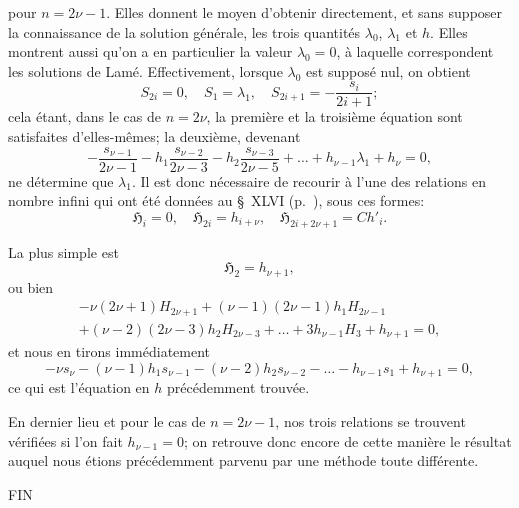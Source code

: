 \documentclass[11pt,leqno,oneside,letterpaper]{book}[2005/09/16]
\begin{document}
pour $n = 2\nu-1$. Elles donnent le moyen d'obtenir directement, et sans
supposer la connaissance de la solution g\'en\'erale, les trois quantit\'es $\lambda_0$, $\lambda_1$
et $h$. Elles montrent aussi qu'on a en particulier la valeur $\lambda_0=0$, \`a laquelle
correspondent les solutions de Lam\'e. Effectivement, lorsque $\lambda_0$ est suppos\'e
nul, on obtient
\[
S_{2i} = 0, \quad S_1 = \lambda_1, \quad S_{2i+1} = -\frac{s_i}{2i+1};
\]
cela \'etant, dans le cas de $n = 2\nu$, la premi\`ere et la troisi\`eme \'equation sont
satisfaites d'elles-m\^emes; la deuxi\`eme, devenant
\[
-\frac{s_{\nu-1}}{2\nu-1} - h_1\frac{s_{\nu-2}}{2\nu-3} - h_2\frac{s_{\nu-3}}{2\nu-5}
  + \ldots + h_{\nu-1} \lambda_1 + h_{\nu} = 0,
\]
ne d\'etermine que $\lambda_1$. Il est donc n\'ecessaire de recourir \`a l'une
des relations en nombre infini qui ont \'et\'e donn\'ees au \S~XLVI
(p.~\pageref{page125}), sous ces formes:
\[
\mathfrak{H}_i = 0, \quad \mathfrak{H}_{2i} = h_{i+\nu}, \quad
   \mathfrak{H}_{2i+2\nu+1} = Ch'_i.
\]

La plus simple est
\[
\mathfrak{H}_2 = h_{\nu+1},
\]
ou bien
\begin{multline*}
-\nu(2\nu+1) H_{2\nu+1} + (\nu-1)(2\nu-1) h_1 H_{2\nu-1} \\
+ (\nu-2)(2\nu-3) h_2 H_{2\nu-3} + \ldots + 3h_{\nu-1} H_3 + h_{\nu+1} = 0,
\end{multline*}
et nous en tirons imm\'ediatement
\[
-\nu s_{\nu} - (\nu-1)h_1 s_{\nu-1} - (\nu-2)h_2 s_{\nu-2} - \ldots - h_{\nu-1} s_1
   +h_{\nu+1} = 0,
\]
ce qui est l'\'equation en $h$ pr\'ec\'edemment trouv\'ee.
\medskip

En dernier lieu et pour le cas de $n = 2\nu-1$, nos trois relations se
trouvent v\'erifi\'ees si l'on fait $h_{\nu-1}=0$; on retrouve donc encore de cette
mani\`ere le r\'esultat auquel nous \'etions pr\'ec\'edemment parvenu par une m\'ethode
toute diff\'erente.

\begin{center}
FIN
\end{center}
\end{document}
